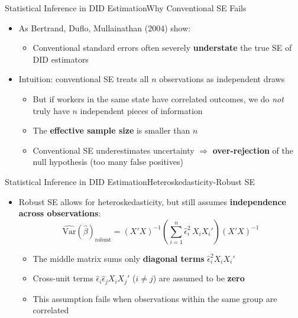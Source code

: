 \documentclass[dvipsnames,hyperref={pdfpagelabels=false}]{beamer}
\begin{document}
\begin{frame}{Statistical Inference in DID Estimation}{Why Conventional SE Fails}
    \begin{itemize}
        \item As Bertrand, Duflo, Mullainathan (2004) show:
        \vspace{0.2cm}
        \begin{itemize}
            \item Conventional standard errors often severely \textbf{understate} the true SE of DID estimators
        \end{itemize}
        \vspace{0.2cm}
        \item Intuition: conventional SE treats all $n$ observations as independent draws
        \vspace{0.2cm}
        \begin{itemize}
            \item But if workers in the same state have correlated outcomes, we do \emph{not} truly have $n$ independent pieces of information
            \vspace{0.2cm}
            \item The \textbf{effective sample size} is smaller than $n$
            \vspace{0.2cm}
            \item Conventional SE underestimates uncertainty $\Rightarrow$ \textbf{over-rejection} of the null hypothesis (too many false positives)
        \end{itemize}
    \end{itemize}
\end{frame}


\begin{frame}{Statistical Inference in DID Estimation}{Heteroskedasticity-Robust SE}
    \begin{itemize}
        \item Robust SE allows for heteroskedasticity, but still assumes \textbf{independence across observations}:
        \[
        \widehat{\text{Var}}(\hat{\beta})_{\text{robust}}
        = \left(X'X\right)^{-1}
          \left(\sum_{i=1}^{n} \hat{\epsilon}_i^2\, X_i X_i'\right)
          \left(X'X\right)^{-1}
        \]
        \vspace{0.1cm}
        \begin{itemize}
            \item The middle matrix sums only \textbf{diagonal terms} $\hat{\epsilon}_i^2 X_i X_i'$
            \vspace{0.2cm}
            \item Cross-unit terms $\hat{\epsilon}_i \hat{\epsilon}_j X_i X_j'$ ($i \neq j$) are assumed to be \textbf{zero}
            \vspace{0.2cm}
            \item This assumption fails when observations within the same group are correlated
        \end{itemize}
    \end{itemize}
\end{frame}
\end{document}
